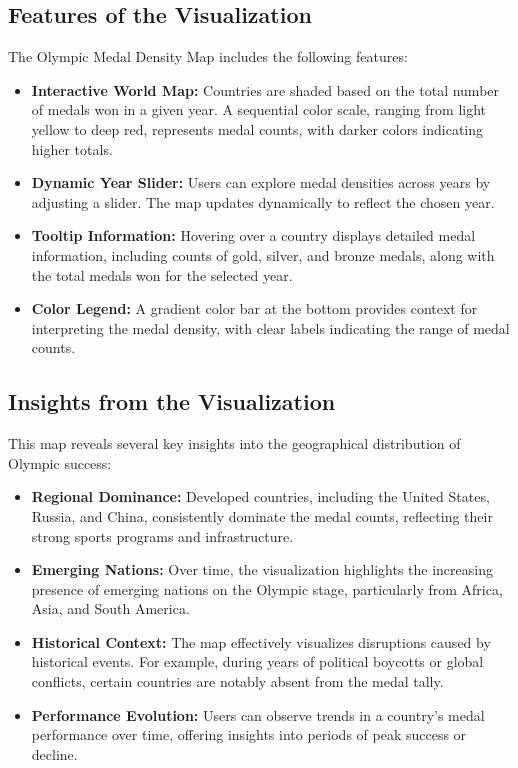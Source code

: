 \subsection{Features of the Visualization}
The Olympic Medal Density Map includes the following features:
\begin{itemize}
    \item \textbf{Interactive World Map:} Countries are shaded based on the total number of medals won in a given year. A sequential color scale, ranging from light yellow to deep red, represents medal counts, with darker colors indicating higher totals.
    \item \textbf{Dynamic Year Slider:} Users can explore medal densities across years by adjusting a slider. The map updates dynamically to reflect the chosen year.
    \item \textbf{Tooltip Information:} Hovering over a country displays detailed medal information, including counts of gold, silver, and bronze medals, along with the total medals won for the selected year.
    \item \textbf{Color Legend:} A gradient color bar at the bottom provides context for interpreting the medal density, with clear labels indicating the range of medal counts.
\end{itemize}

\subsection{Insights from the Visualization}
This map reveals several key insights into the geographical distribution of Olympic success:
\begin{itemize}
    \item \textbf{Regional Dominance:} Developed countries, including the United States, Russia, and China, consistently dominate the medal counts, reflecting their strong sports programs and infrastructure.
    \item \textbf{Emerging Nations:} Over time, the visualization highlights the increasing presence of emerging nations on the Olympic stage, particularly from Africa, Asia, and South America.
    \item \textbf{Historical Context:} The map effectively visualizes disruptions caused by historical events. For example, during years of political boycotts or global conflicts, certain countries are notably absent from the medal tally.
    \item \textbf{Performance Evolution:} Users can observe trends in a country's medal performance over time, offering insights into periods of peak success or decline.
\end{itemize}
